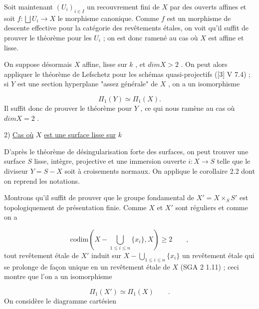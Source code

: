 Soit maintenant $(U_i)_{i \in I}$ un recouvrement fini de $X$ par des ouverts affines et soit $f : \bigsqcup U_i \longrightarrow X$ le morphisme canonique. Comme $f$ est un morphisme de descente effective pour la catégorie des revêtements étales, on voit qu'il suffit de prouver le théorème pour les $U_i$ ; on est donc ramené au cas où $X$ est affine et lisse.

On suppose désormais $X$ affine, lisse sur $k$ , et $dim X > 2$ . On peut alors appliquer le théorème de Lefschetz pour les schémas quasi-projectifs ([3] V 7.4) ; si $Y$ est une section hyperplane "assez générale" de $X$ , on a un isomorphisme

\begin{equation*}
\Pi_1(Y) \simeq \Pi_1(X) .
\end{equation*}
Il suffit donc de prouver le théorème pour $Y$ , ce qui nous ramène au cas où $dim X = 2$ .


2) \underline{Cas où} $X$ \underline{est une surface lisse sur} $k$

D'après le théorème de désingularisation forte des surfaces, on peut trouver une surface $S$ lisse, intègre, projective et une immersion ouverte $i : X \longrightarrow S$ telle que le diviseur $Y = S - X$ soit à croisements normaux. On applique le corollaire 2.2 dont on reprend les notations.


Montrons qu'il suffit de prouver que le groupe fondamental de $X' = X\times_S S'$ est topologiquement de présentation finie. Comme $X$ et $X'$ sont réguliers et comme on a

\begin{equation*}
\mathrm{codim}(X- \bigcup_{1\leqslant i\leqslant n} \{x_i\},X) \geqslant 2 \qquad ,
\end{equation*}
tout revêtement étale de $X'$ induit sur $X- \bigcup_{1\leqslant i\leqslant n}\{x_i\}$ un revêtement étale qui se prolonge de façon unique en un revêtement étale de $X$ (SGA 2 1.11) ; ceci montre que l'on a un isomorphisme

\begin{equation*}
\Pi_1(X') \simeq \Pi_1(X) \qquad .
\end{equation*}
On considère le diagramme cartésien

